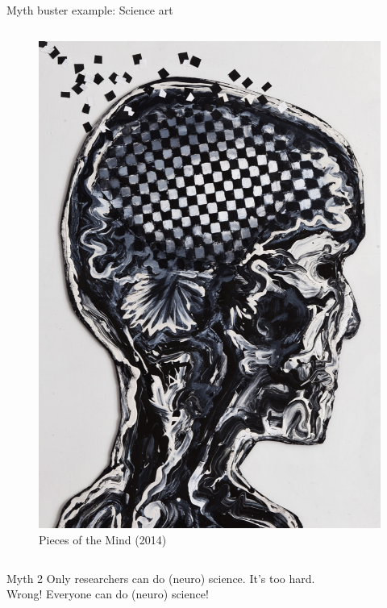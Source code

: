 \begin{frame}[c]{Myth buster example: Science art}
\begin{columns}
\begin{column}{0.5\textwidth}
\begin{figure}[h]
        \includegraphics[height=0.6\textheight]{images/rebeccaivatts-pieces-of-mind.jpg}
        \caption{Pieces of the Mind (2014)}
      \end{figure}
    \end{column}
  \end{columns}
\end{frame}
\begin{frame}[c]{Myth 2}
  \textcolor{FriendsMagenta}{Only researchers can do (neuro) science. It's too hard.}\\
  \vspace{0.5cm}
  \pause{}
  \textcolor{FirstGreen}{Wrong! Everyone can do (neuro) science!}\\
\end{frame}
